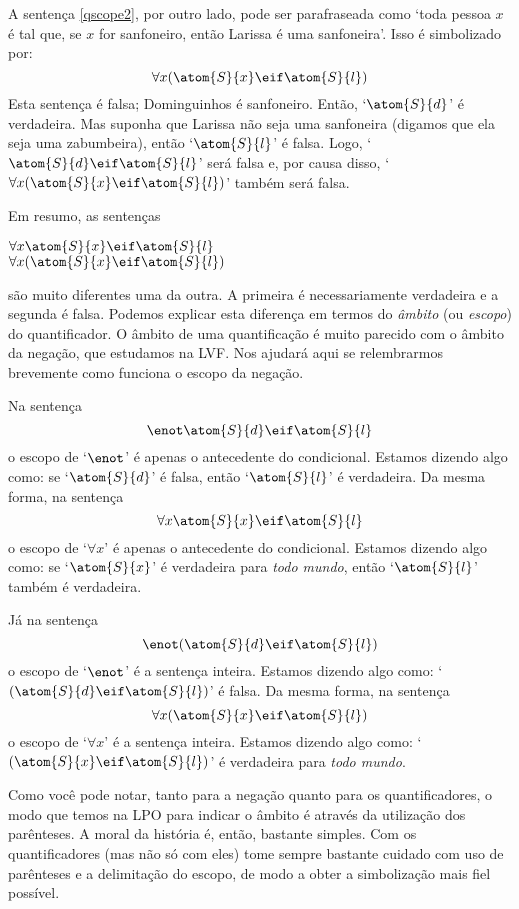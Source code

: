 A sentença \ref{qscope2}, por outro lado, pode ser parafraseada como `toda pessoa $x$ é tal que, se $x$ for sanfoneiro, então Larissa é uma sanfoneira'. Isso é simbolizado por:
$$\forall x (\atom{S}{x} \eif \atom{S}{l})$$
Esta sentença é falsa; Dominguinhos é sanfoneiro.
Então, `$\atom{S}{d}$' é verdadeira. 
Mas suponha que Larissa não seja uma sanfoneira (digamos que ela seja  uma zabumbeira), então `$\atom{S}{l}$' é falsa.
Logo, `$\atom{S}{d} \eif \atom{S}{l}$' será falsa e, por causa disso, \mbox{`$\forall x (\atom{S}{x} \eif \atom{S}{l})$'} também será falsa.

Em resumo, as sentenças
\begin{center}
	$\forall x \atom{S}{x} \eif \atom{S}{l}$ \\ $\forall x (\atom{S}{x} \eif \atom{S}{l})$
\end{center} 
são muito diferentes uma da outra.
A primeira é necessariamente verdadeira e a segunda é falsa.
Podemos explicar esta diferença em termos do \emph{âmbito} (ou \emph{escopo}) do quantificador.
O âmbito de uma quantificação é muito parecido com o âmbito da negação, que estudamos na LVF.
Nos ajudará aqui se relembrarmos brevemente como funciona o escopo da negação.

Na sentença
$$\enot \atom{S}{d} \eif \atom{S}{l}$$
o escopo de `$\enot$' é apenas o antecedente do condicional. Estamos dizendo algo como: se `$\atom{S}{d}$' é falsa, então `$\atom{S}{l}$' é verdadeira.
Da mesma forma, na sentença
$$\forall x \atom{S}{x} \eif \atom{S}{l}$$
o escopo de `$\forall x$' é apenas o antecedente do condicional.
Estamos dizendo algo como: se `$\atom{S}{x}$' é verdadeira para \emph{todo mundo}, então `$\atom{S}{l}$' também é verdadeira.

Já na sentença
$$\enot(\atom{S}{d} \eif \atom{S}{l})$$
o escopo de `$\enot$' é a sentença inteira.
Estamos dizendo algo como: `$(\atom{S}{d} \eif \atom{S}{l})$' é falsa.
Da mesma forma, na sentença
$$\forall x (\atom{S}{x} \eif \atom{S}{l})$$
o escopo de `$\forall x$' é a sentença inteira.
Estamos dizendo algo como: `$(\atom{S}{x} \eif \atom{S}{l})$' é verdadeira para \emph{todo mundo}.

Como você pode notar, tanto para a negação quanto para os quantificadores, o modo que temos na LPO para indicar o âmbito é  através da utilização dos parênteses.
A moral da história é, então, bastante simples.
Com os quantificadores (mas não só com eles) tome sempre bastante cuidado com  uso de parênteses e a delimitação do escopo, de modo a obter a simbolização mais fiel possível.


